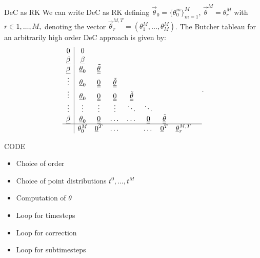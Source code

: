 \documentclass[aspectratio=169]{beamer}
\begin{document}
\begin{frame}{DeC as RK}
	We can write DeC as RK defining $\vec{\theta}_0 = \lbrace\theta_0^m\rbrace_{m=1}^M$, $\vec{\theta}^M=\theta_r^{M}$ with $r \in 1, \dots, M, $  denoting the vector  $ \vec{\theta}_r^{M,T} =(\theta_1^M, \dots, \theta_M^M )$.
		The Butcher tableau for an arbitrarily high order DeC approach is given by:
		\begin{equation}\label{eq:DeC_RK}
			\begin{aligned}
				\begin{array}{c|cccccccc}
					0 & 0 &   & &  & & &  & \\
					\underline{\beta} & \underline{\beta} &  &   & & & & &  \\
					\underline{\beta}  & \underline{\theta}_0 &   \underline{\underline{\tilde{\theta}}} & & & & & &\\
					\vdots & \underline{\theta}_0 & \underline{\underline{0}}  &\underline{\underline{\tilde{\theta}}}   && & & &\\
					\vdots & \underline{\theta}_0 &  \underline{\underline{0}}   &   \underline{\underline{0}}  & \underline{\underline{\tilde{\theta}}}  &  &  & &\\
					\vdots &  \vdots  &  \vdots &  \vdots &  \ddots  &  \ddots& & & \\
					\underline{\beta} & \underline{\theta}_0 &  \underline{\underline{0}}  &  \dots &  \dots & \underline{\underline{0}}  &  \underline{\underline{\tilde{\theta}}} & \\
					\hline
					&  \theta_0^M & \underline{0}^T    & \dots  &   &   \dots &    \underline{0}^T& \underline{\theta}_r^{M,T} 
				\end{array}.
			\end{aligned}
	\end{equation}
\end{frame}

\begin{frame}{CODE}
\begin{itemize}
	\item Choice of order
	\item Choice of point distributions $t^0, \dots, t^M$
	\item Computation of $\theta$
	\item Loop for timesteps
	\item Loop for correction
	\item Loop for subtimesteps
\end{itemize}
\end{frame}
\end{document}
